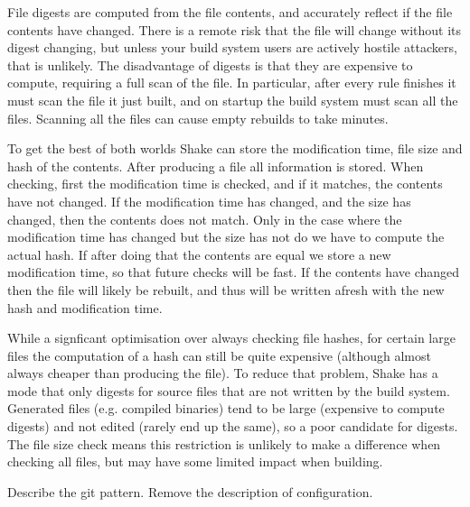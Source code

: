 File digests are computed from the file contents, and accurately reflect if the file contents have changed. There is a remote risk that the file will change without its digest changing, but unless your build system users are actively hostile attackers, that is unlikely. The disadvantage of digests is that they are expensive to compute, requiring a full scan of the file. In particular, after every rule finishes it must scan the file it just built, and on startup the build system must scan all the files. Scanning all the files can cause empty rebuilds to take minutes.

To get the best of both worlds Shake can store the modification time, file size and hash of the contents. After producing a file all information is stored. When checking, first the modification time is checked, and if it matches, the contents have not changed. If the modification time has changed, and the size has changed, then the contents does not match. Only in the case where the modification time has changed but the size has not do we have to compute the actual hash. If after doing that the contents are equal we store a new modification time, so that future checks will be fast. If the contents have changed then the file will likely be rebuilt, and thus will be written afresh with the new hash and modification time.

While a signficant optimisation over always checking file hashes, for certain large files the computation of a hash can still be quite expensive (although almost always cheaper than producing the file). To reduce that problem, Shake has a mode that only digests for source files that are not written by the build system. Generated files (e.g. compiled binaries) tend to be large (expensive to compute digests) and not edited (rarely end up the same), so a poor candidate for digests. The file size check means this restriction is unlikely to make a difference when checking all files, but may have some limited impact when building.

Describe the git pattern. Remove the description of configuration.
